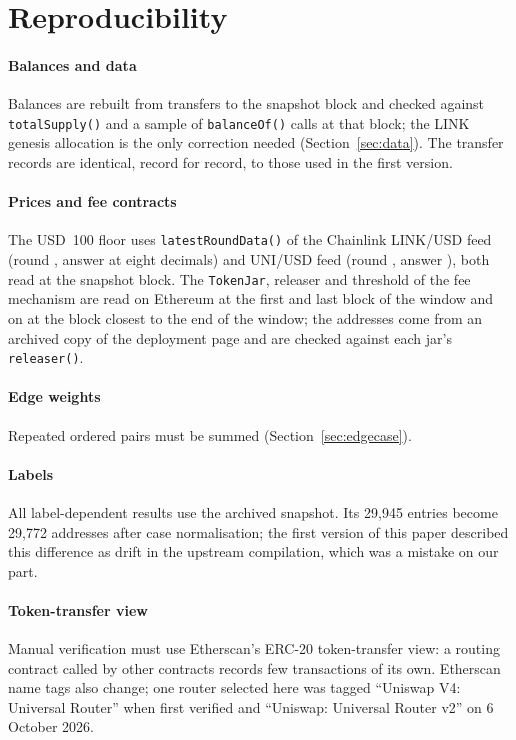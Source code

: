 \section{Reproducibility}
\label{app:repro}

\paragraph{Balances and data} Balances are rebuilt from transfers to the
snapshot block and checked against \texttt{totalSupply()} and a sample of
\texttt{balanceOf()} calls at that block; the LINK genesis allocation is the
only correction needed (Section~\ref{sec:data}). The transfer records are
identical, record for record, to those used in the first version.

\paragraph{Prices and fee contracts} The USD~100 floor uses
\texttt{latestRoundData()} of the Chainlink LINK/USD feed
 (round , answer  at
eight decimals) and UNI/USD feed  (round ,
answer ), both read at the snapshot block. The
\texttt{TokenJar}, releaser and threshold of the fee mechanism are read on
Ethereum at the first and last block of the window and on
 at the block closest to the end of the window; the
addresses come from an archived copy of the deployment page
\cite{uniswap2026deployments} and are checked against each jar's
\texttt{releaser()}.

\paragraph{Edge weights} Repeated ordered pairs must be summed
(Section~\ref{sec:edgecase}).

\paragraph{Labels} All label-dependent results use the archived snapshot.
Its 29{,}945 entries become 29{,}772 addresses after case normalisation; the
first version of this paper described this difference as drift in the
upstream compilation, which was a mistake on our part.

\paragraph{Token-transfer view} Manual verification must use Etherscan's
ERC-20 token-transfer view: a routing contract called by other contracts
records few transactions of its own. Etherscan name tags also change; one
router selected here was tagged ``Uniswap V4: Universal Router'' when first
verified and ``Uniswap: Universal Router v2'' on 6 October 2026.

